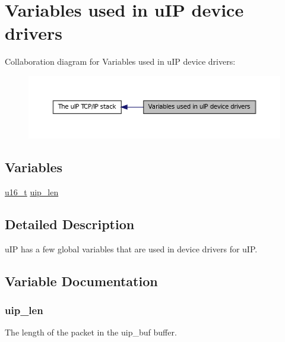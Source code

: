 \hypertarget{group__uipdrivervars}{
\section{Variables used in uIP device drivers}
\label{group__uipdrivervars}
}


Collaboration diagram for Variables used in uIP device drivers:
\nopagebreak
\begin{figure}[H]
\begin{center}
\leavevmode
\includegraphics[width=400pt]{group__uipdrivervars}
\end{center}
\end{figure}


\subsection*{Variables}
\begin{DoxyCompactItemize}
\item 
\hyperlink{group__uipfw_ga77570ac4fcab86864fa1916e55676da2}{u16\_\-t} \hyperlink{group__uipdrivervars_ga12a33f0c09711167bdf3dd7d7cf8c5a1}{uip\_\-len}
\end{DoxyCompactItemize}


\subsection{Detailed Description}
uIP has a few global variables that are used in device drivers for uIP. 

\subsection{Variable Documentation}
\hypertarget{group__uipdrivervars_ga12a33f0c09711167bdf3dd7d7cf8c5a1}{
\subsubsection[{uip\_\-len}]{ {\bf uip\_\-len}}}
\label{group__uipdrivervars_ga12a33f0c09711167bdf3dd7d7cf8c5a1}
The length of the packet in the uip\_\-buf buffer.

